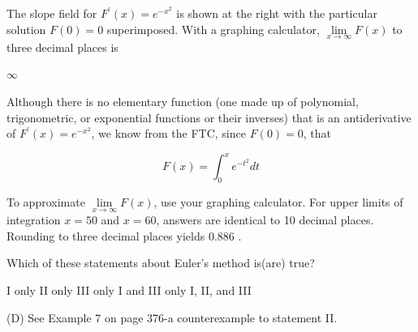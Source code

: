 \question
The slope field for $F^{\prime}(x)=e^{-x^{2}}$ is shown at the right with the particular solution $F(0)=0$ superimposed. With a graphing calculator, $\lim\limits_{x \to \infty} F(x)$ to three decimal places is
\begin{choices}
  \choice $\infty$
\end{choices}
\begin{solution}
Although there is no elementary function (one made up of polynomial, trigonometric, or exponential functions or their inverses) that is an antiderivative of $F^{\prime}(x)=e^{-x^{2}}$, we know from the FTC, since $F(0)=0$, that

\[
F(x)=\int_{0}^{x} e^{-t^{2}} d t
\]

To approximate $\lim\limits_{x \to \infty} F(x)$, use your graphing calculator.
For upper limits of integration $x=50$ and $x=60$, answers are identical to 10 decimal places. Rounding to three decimal places yields 0.886 .
\end{solution}

\question
Which of these statements about Euler's method is(are) true?

\begin{choices}
  \choice I only
  \choice II only
  \choice III only
  \CorrectChoice I and III only
  \choice I, II, and III
\end{choices}
\begin{solution}
(D) See Example 7 on page 376-a counterexample to statement II.
\end{solution}

